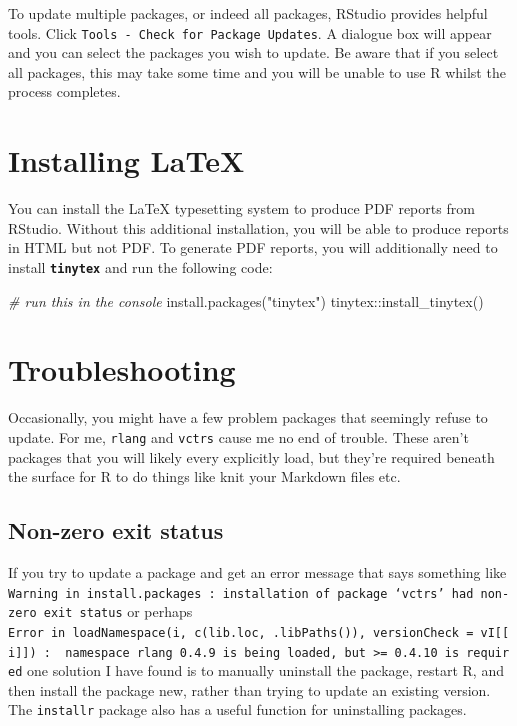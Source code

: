\documentclass[
  oneside]{book}
\newenvironment{Shaded}{\begin{snugshade}}{\end{snugshade}}
\newcommand{\CommentTok}[1]{\textcolor[rgb]{0.56,0.35,0.01}{\textit{#1}}}
\newcommand{\FunctionTok}[1]{\textcolor[rgb]{0.00,0.00,0.00}{#1}}
\newcommand{\NormalTok}[1]{#1}
\newcommand{\SpecialCharTok}[1]{\textcolor[rgb]{0.00,0.00,0.00}{#1}}
\newcommand{\StringTok}[1]{\textcolor[rgb]{0.31,0.60,0.02}{#1}}
\begin{document}
To update multiple packages, or indeed all packages, RStudio provides helpful tools. Click \texttt{Tools\ -\ Check\ for\ Package\ Updates}. A dialogue box will appear and you can select the packages you wish to update. Be aware that if you select all packages, this may take some time and you will be unable to use R whilst the process completes.

\hypertarget{installing-latex}{%
\section{Installing LaTeX}\label{installing-latex}}

You can install the LaTeX typesetting system to produce PDF reports from RStudio. Without this additional installation, you will be able to produce reports in HTML but not PDF. To generate PDF reports, you will additionally need to install \textbf{\texttt{tinytex}} \citep{R-tinytex} and run the following code:

\begin{Shaded}
\begin{Highlighting}[]
\CommentTok{\# run this in the console}
\FunctionTok{install.packages}\NormalTok{(}\StringTok{"tinytex"}\NormalTok{)}
\NormalTok{tinytex}\SpecialCharTok{::}\FunctionTok{install\_tinytex}\NormalTok{()}
\end{Highlighting}
\end{Shaded}

\hypertarget{package-install-troubleshooting}{%
\section{Troubleshooting}\label{package-install-troubleshooting}}

Occasionally, you might have a few problem packages that seemingly refuse to update. For me, \texttt{rlang} and \texttt{vctrs} cause me no end of trouble. These aren't packages that you will likely every explicitly load, but they're required beneath the surface for R to do things like knit your Markdown files etc.

\hypertarget{non-zero-exit-status}{%
\subsection{Non-zero exit status}\label{non-zero-exit-status}}

If you try to update a package and get an error message that says something like \texttt{Warning\ in\ install.packages\ :\ installation\ of\ package\ ‘vctrs’\ had\ non-zero\ exit\ status} or perhaps \texttt{Error\ in\ loadNamespace(i,\ c(lib.loc,\ .libPaths()),\ versionCheck\ =\ vI{[}{[}i{]}{]})\ :\ \ namespace\ \textquotesingle{}rlang\textquotesingle{}\ 0.4.9\ is\ being\ loaded,\ but\ \textgreater{}=\ 0.4.10\ is\ required} one solution I have found is to manually uninstall the package, restart R, and then install the package new, rather than trying to update an existing version. The \texttt{installr} package also has a useful function for uninstalling packages.
\end{document}
